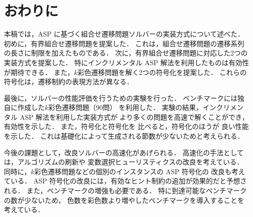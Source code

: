 ﻿%
\section{おわりに}\label{chap:conclusion}

本稿では，ASP に基づく組合せ遷移問題ソルバーの実装方式について述べた．
初めに，有界組合せ遷移問題を提案した．
これは，組合せ遷移問題の遷移系列の長さに制限を加えたものである．
次に，有界組合せ遷移問題に対応した2つの実装方式を提案した．
特にインクリメンタル ASP 解法を利用したものは有効性が期待できる．
また，$k$彩色遷移問題を解く2つの符号化を提案した．
これらの符号化は，遷移制約の表現方法が異なる．

最後に，ソルバーの性能評価を行うための実験を行った．
ベンチマークには独自に作成した$k$彩色遷移問題（90問）
を利用した．
実験の結果，インクリメンタル ASP 解法を利用した実装方式が
より多くの問題を高速で解くことができ，有効性を示した．
また，符号化と符号化を
比べると，符号化のほうが
良い性能を示した．
これは基礎化によって生成される節数が少ないためと考えられる．

今後の課題として，改良ソルバーの高速化があげられる．
高速化の手法としては，アルゴリズムの刷新や
変数選択ヒューリスティクスの改良を考えている．
同時に，$k$彩色遷移問題などの個別のインスタンスの ASP 符号化の
改良も考えている．
ASP 符号化の改良には，有効なヒント制約の追加が効果的だと予想される．
また，ベンチマークの増強も必要である．
特に到達可能なベンチマークの数が少ないため，
色数を彩色数より増やしたベンチマークを導入することを考えている．

%


